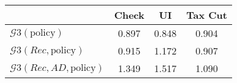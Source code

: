 \begin{tabular}{@{}lccc@{}} 
\toprule 
                          & Check      & UI    & Tax Cut    \\  \midrule 
$\mathcal{G}3(\text{policy})$ & 0.897  & 0.848  & 0.904     \\ 
$\mathcal{G}3(Rec,\text{policy})$ & 0.915  & 1.172  & 0.907     \\ 
$\mathcal{G}3(Rec, AD,\text{policy})$ & 1.349  & 1.517  & 1.090     \\ 
\end{tabular}  
